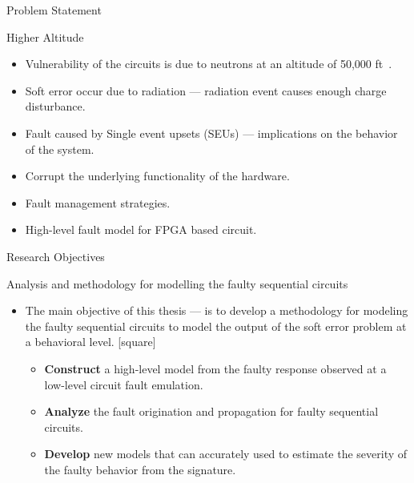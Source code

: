 \documentclass[aspectratio=1610]{beamer}
\newcommand{\semitransp}[2][35]{\color{fg!#1}#2}
\begin{document}
\begin{frame}{Problem Statement}
\vspace{-1.5cm}
\begin{block}{Higher Altitude}

\end{block}
\begin{itemize}
\item Vulnerability of the circuits is due to neutrons at an altitude of  50,000 ft~\citep{xilinnseu}.
\item Soft error occur due to radiation ---  radiation event causes enough charge disturbance.
\item Fault caused by Single event upsets (SEUs) --- implications on the behavior of the system.
\item Corrupt the underlying functionality of the hardware.


\item Fault management strategies.
\item High-level fault model for FPGA based circuit.




\end{itemize}




\end{frame}
\begin{frame}{Research Objectives}

\begin{block}{Analysis and methodology for modelling the faulty sequential circuits}
\end{block}
\begin{itemize}

\item The main objective of this thesis --- is to develop a methodology for modeling the faulty sequential circuits to model the output of the soft error problem at a behavioral level. 
\vspace{0.25cm}
[square]
\begin{itemize}
\item \textbf{Construct} a high-level model from the faulty response observed at a low-level circuit fault emulation.
\vspace{0.25cm}
\item \textbf{Analyze} the fault origination and propagation for faulty sequential circuits.

 \vspace{0.25cm}
 
\item \textbf{Develop} new models that can accurately used to estimate the severity of the faulty behavior from the signature. 
\end{itemize}

\end{itemize}




\end{frame}
\end{document}
